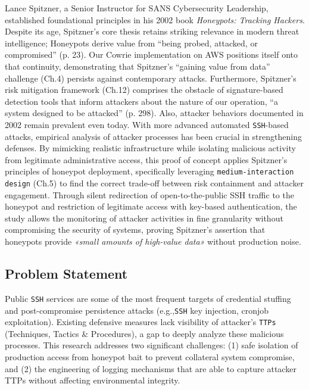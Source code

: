 \documentclass{cls/ULBreport}
\begin{document}
    
    Lance Spitzner, a Senior Instructor for SANS Cybersecurity Leadership, established foundational principles in his 2002 book \textit{Honeypots: Tracking Hackers}. 
Despite its age, Spitzner's core thesis retains striking relevance in modern threat intelligence; Honeypots derive value from \enquote{being probed, attacked, or compromised} (p. 23). Our Cowrie implementation on AWS positions itself onto that continuity, demonstrating that Spitzner's \enquote{gaining value from data} challenge (Ch.4) persists against contemporary attacks. Furthermore, Spitzner's risk mitigation framework (Ch.12) comprises the obstacle of signature-based detection tools that inform attackers about the nature of our operation, \enquote{a system designed to be attacked} (p. 298). Also, attacker behaviors documented in 2002 remain prevalent even today.
    With more advanced automated \texttt{SSH}-based attacks, empirical analysis of attacker processes has been crucial in strengthening defenses. By mimicking realistic infrastructure while isolating malicious activity from legitimate administrative access, this proof of concept applies Spitzner's principles of honeypot deployment, specifically leveraging \texttt{medium-interaction design} (Ch.5) to find the correct trade-off between risk containment and attacker engagement. Through silent redirection of open-to-the-public SSH traffic to the honeypot and restriction of legitimate access with key-based authentication, the study allows the monitoring of attacker activities in fine granularity without compromising the security of systems, proving Spitzner's assertion that honeypots provide \textit{«small amounts of high-value data»} without production noise.  

        \subsection{Problem Statement} 
        Public \texttt{SSH} services are some of the most frequent targets of credential stuffing and post-compromise persistence attacks (e.g.,\texttt{SSH} key injection, cronjob exploitation). Existing defensive measures lack visibility of attacker's \texttt{TTPs} (Techniques, Tactics \& Procedures), a gap
        to deeply analyze these malicious processes. This research addresses two significant challenges: (1) safe isolation of production access from honeypot bait to prevent collateral system compromise, and (2) the engineering of logging mechanisms that are able to capture attacker TTPs without affecting environmental integrity.
\end{document}
